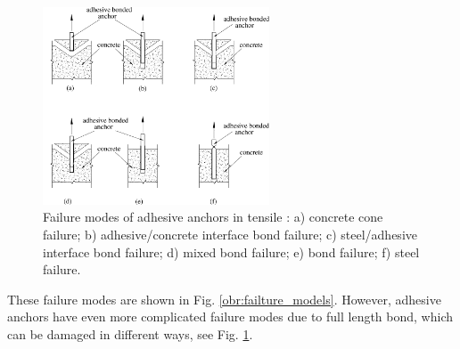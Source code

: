 \begin{figure}[h!]
	\centering
	\includegraphics[width=0.6\textwidth]{obrazky/adhesive_failture_models_repaired.png}
	\caption[Failure modes of adhesive anchors in tensile]{Failure modes of adhesive anchors in tensile \cite{adhesive_anchors}: a) concrete cone failure; b) adhesive/concrete interface bond failure; c) steel/adhesive interface bond failure; d) mixed bond failure; e) bond failure; f) steel failure.}
	\label{obr:failture_adhesive_models}
\end{figure}
 
These failure modes are shown in Fig. \ref{obr:failture_models}. However, adhesive anchors have even more complicated failure modes due to full length bond, which can be damaged in different ways, see Fig. \ref{obr:failture_adhesive_models}.
